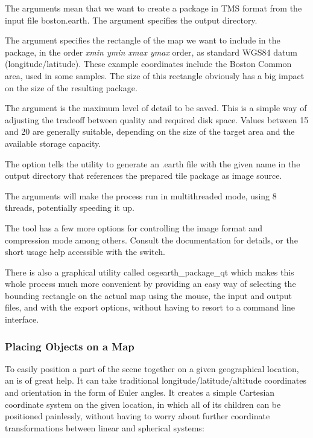 The  arguments mean that we want to create a package
in TMS format from the input file boston.earth. The 
argument specifies the output directory.

The  argument specifies the rectangle of the map we want to include
in the package, in the order \textit{xmin ymin xmax ymax} order, as standard WGS84
datum (longitude/latitude). These example coordinates include the Boston Common
area, used in some samples. The size of this rectangle obviously has a big impact
on the size of the resulting package.

The  argument is the maximum level of detail to be saved. This
is a simple way of adjusting the tradeoff between quality and required disk space.
Values between 15 and 20 are generally suitable, depending on the size of the
target area and the available storage capacity.

The  option tells the utility to generate
an .earth file with the given name in the output directory that references the
prepared tile package as image source.

The  arguments will make the process run in multithreaded
mode, using 8 threads, potentially speeding it up.

The tool has a few more options for controlling the image format and compression
mode among others. Consult the documentation for details, or the short usage help
accessible with the  switch.

There is also a graphical utility called osgearth\_package\_qt which makes this
whole process much more convenient by providing an easy way of selecting the
bounding rectangle on the actual map using the mouse, the input and output files,
and with the export options, without having to resort to a command line interface.


\subsubsection{Placing Objects on a Map}
\label{sec:graphics:osgearth-placing-objects}

To easily position a part of the scene together on a given geographical location,
an  is of great help. It can take
traditional longitude/latitude/altitude coordinates and orientation in the form
of Euler angles. It creates a simple Cartesian coordinate system on the given
location, in which all of its children can be positioned painlessly, without
having to worry about further coordinate transformations between linear and
spherical systems:


